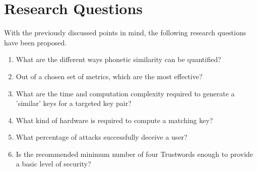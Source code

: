 \section{Research Questions}

With the previously discussed points in mind, the following research questions have been proposed.

\begin{enumerate}
    \item What are the different ways phonetic similarity can be quantified?  \label{goal:phoneticSimilarity}

    \item Out of a chosen set of metrics, which are the most effective? \label{goal:bestMetrics}

    \item What are the time and computation complexity required to generate a 'similar' keys for a targeted key pair? \label{goal:complexity}
    
    \item What kind of hardware is required to compute a matching key? \label{goal:hardwareRequired}

    \item What percentage of attacks successfully deceive a user? \label{goal:attackPercentage}

    \item Is the recommended minimum number of four Trustwords enough to provide a basic level of security? \label{goal:numberOfTrustwords}
\end{enumerate}
